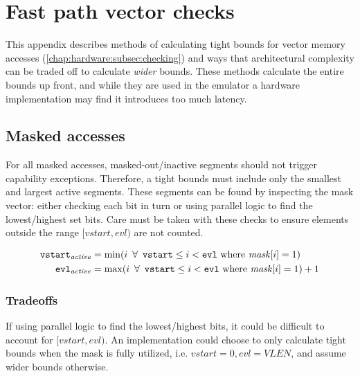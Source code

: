 \chapter{Fast path vector checks}\label{appx:fastpathfull}
This appendix describes methods of calculating tight bounds for vector memory accesses (\cref{chap:hardware:subsec:checking}) and ways that architectural complexity can be traded off to calculate \emph{wider} bounds.
These methods calculate the entire bounds up front, and while they are used in the emulator a hardware implementation may find it introduces too much latency.


\newcommand{\vstart}{\code{vstart}}
\newcommand{\vstartactive}{\code{vstart}_{\mathit{active}}}
\newcommand{\evl}{\code{evl}}
\newcommand{\evlactive}{\code{evl}_{\mathit{active}}}
\newcommand{\baseaddr}{\code{base}}

\section{Masked accesses}
For all masked accesses, masked-out/inactive segments should not trigger capability exceptions.
Therefore, a tight bounds must include only the smallest and largest active segments.
These segments can be found by inspecting the mask vector: either checking each bit in turn or using parallel logic to find the lowest/highest set bits.
Care must be taken with these checks to ensure elements outside the range $[\textit{vstart}, \textit{evl})$ are not counted.

\begin{align}
    \vstartactive{} &= \min(i\ \forall\ \vstart{} \le i < \evl{}\ \text{where}\ \mathit{mask}[i] = 1) \\
    \evlactive{}    &= \max(i\ \forall\ \vstart{} \le i < \evl{}\ \text{where}\ \mathit{mask}[i] = 1) + 1
\end{align}

\subsection*{Tradeoffs}
If using parallel logic to find the lowest/highest bits, it could be difficult to account for $[\textit{vstart}, \textit{evl})$.
An implementation could choose to only calculate tight bounds when the mask is fully utilized, i.e. $\textit{vstart} = 0, \textit{evl} = \textit{VLEN}$, and assume wider bounds otherwise.

